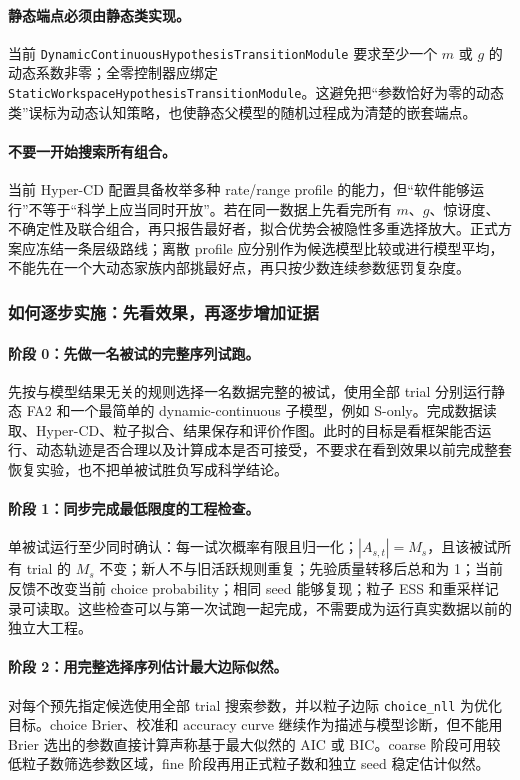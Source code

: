 \paragraph{静态端点必须由静态类实现。}
当前 \texttt{DynamicContinuousHypothesisTransitionModule} 要求至少一个
$m$ 或 $g$ 的动态系数非零；全零控制器应绑定
\texttt{StaticWorkspaceHypothesisTransitionModule}。这避免把“参数恰好为零的动态类”误标为动态认知策略，也使静态父模型的随机过程成为清楚的嵌套端点。

\paragraph{不要一开始搜索所有组合。}
当前 Hyper-CD 配置具备枚举多种 rate/range profile 的能力，但“软件能够运行”不等于“科学上应当同时开放”。若在同一数据上先看完所有 $m$、$g$、惊讶度、不确定性及联合组合，再只报告最好者，拟合优势会被隐性多重选择放大。正式方案应冻结一条层级路线；离散 profile 应分别作为候选模型比较或进行模型平均，不能先在一个大动态家族内部挑最好点，再只按少数连续参数惩罚复杂度。


\subsubsection{如何逐步实施：先看效果，再逐步增加证据}

\paragraph{阶段 0：先做一名被试的完整序列试跑。}
先按与模型结果无关的规则选择一名数据完整的被试，使用全部 trial 分别运行静态 FA2 和一个最简单的 dynamic-continuous 子模型，例如 S-only。完成数据读取、Hyper-CD、粒子拟合、结果保存和评价作图。此时的目标是看框架能否运行、动态轨迹是否合理以及计算成本是否可接受，不要求在看到效果以前完成整套恢复实验，也不把单被试胜负写成科学结论。

\paragraph{阶段 1：同步完成最低限度的工程检查。}
单被试运行至少同时确认：每一试次概率有限且归一化；$|A_{s,t}|=M_s$，且该被试所有 trial 的 $M_s$ 不变；新人不与旧活跃规则重复；先验质量转移后总和为 1；当前反馈不改变当前 choice probability；相同 seed 能够复现；粒子 ESS 和重采样记录可读取。这些检查可以与第一次试跑一起完成，不需要成为运行真实数据以前的独立大工程。

\paragraph{阶段 2：用完整选择序列估计最大边际似然。}
对每个预先指定候选使用全部 trial 搜索参数，并以粒子边际 \texttt{choice\_nll} 为优化目标。choice Brier、校准和 accuracy curve 继续作为描述与模型诊断，但不能用 Brier 选出的参数直接计算声称基于最大似然的 AIC 或 BIC。coarse 阶段可用较低粒子数筛选参数区域，fine 阶段再用正式粒子数和独立 seed 稳定估计似然。

